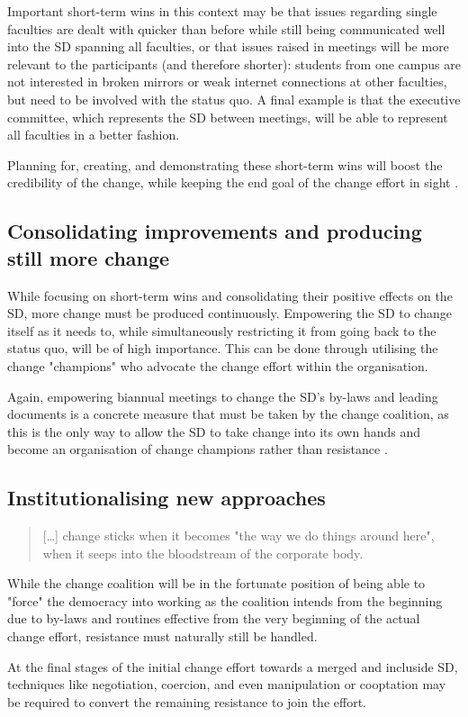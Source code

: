 Important short-term wins in this context may be that issues regarding single faculties are dealt with quicker than before while still being communicated well into the SD spanning all faculties, or that issues raised in meetings will be more relevant to the participants (and therefore shorter): students from one campus are not interested in broken mirrors or weak internet connections at other faculties, but need to be involved with the status quo. A final example is that the executive committee, which represents the SD between meetings, will be able to represent all faculties in a better fashion.

Planning for, creating, and demonstrating these short-term wins will boost the credibility of the change, while keeping the end goal of the change effort in sight \autocite{kotter:leading-change-why-transformation-efforts-fail:1995}.

\subsection{Consolidating improvements and producing still more change}

While focusing on short-term wins and consolidating their positive effects on the SD, more change must be produced continuously. Empowering the SD to change itself as it needs to, while simultaneously restricting it from going back to the status quo, will be of high importance. This can be done through utilising the change "champions" who advocate the change effort within the organisation.

Again, empowering biannual meetings to change the SD's by-laws and leading documents is a concrete measure that must be taken by the change coalition, as this is the only way to allow the SD to take change into its own hands and become an organisation of change champions rather than resistance \autocite[12395]{luftman:managing-the-information-technology-resource:2009}.

\subsection{Institutionalising new approaches}

\begin{quote}
    [\dots] change sticks when it becomes "the way we do things around here", when it seeps into the bloodstream of the corporate body.
\end{quote}
\autocite[9]{kotter:leading-change-why-transformation-efforts-fail:1995}

While the change coalition will be in the fortunate position of being able to "force" the democracy into working as the coalition intends from the beginning due to by-laws and routines effective from the very beginning of the actual change effort, resistance must naturally still be handled.

At the final stages of the initial change effort towards a merged and incluside SD, techniques like negotiation, coercion, and even manipulation or cooptation may be required to convert the remaining resistance to join the effort.
